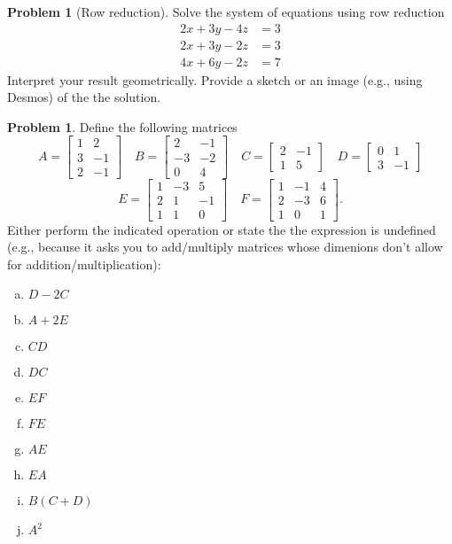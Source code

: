 \documentclass[10pt]{article}
\theoremstyle{definition}
\newtheorem{problem}[theorem]{Problem}
\newcommand{\1}[1]{\textbf{1}_{\left[#1\right]}} %
\begin{document}
\begin{problem}[Row reduction]
  Solve the system of equations using row reduction
  \begin{align*}
    2x+3y-4z&=3\\
    2x+3y-2z&=3\\
    4x+6y-2z&=7
  \end{align*}
  Interpret your result geometrically. Provide a sketch or an image (e.g.,
  using Desmos) of the the solution.
\end{problem}

\begin{problem}
  Define the following matrices
  \begin{equation*}
    A =
    \begin{bmatrix}
      1&2\\
      3&-1\\
      2&-1
    \end{bmatrix}
    \quad
    B =
    \begin{bmatrix}
      2&-1\\
      -3&-2\\
      0&4
    \end{bmatrix}
    \quad
    C =
    \begin{bmatrix}
      2&-1\\
      1&5
    \end{bmatrix}
    \quad
    D =
    \begin{bmatrix}
      0&1\\
      3&-1
    \end{bmatrix}
  \end{equation*}
  \begin{equation*}
    E =
    \begin{bmatrix}
      1&-3&5\\
      2&1&-1\\
      1&1&0
    \end{bmatrix}
    \quad
    F =
    \begin{bmatrix}
      1&-1&4\\
      2&-3&6\\
      1&0&1
    \end{bmatrix}.
  \end{equation*}
  Either perform the indicated operation or state the the expression is
  undefined (e.g., because it asks you to add/multiply matrices whose dimenions
  don't allow for addition/multiplication):
  \begin{enumerate}[(a)]
    \item $D-2C$
    \item $A+2E$
    \item $CD$
    \item $DC$
    \item $EF$
    \item $FE$
    \item $AE$
    \item $EA$
    \item $B(C+D)$
    \item $A^{2}$
  \end{enumerate}
\end{problem}
\end{document}

